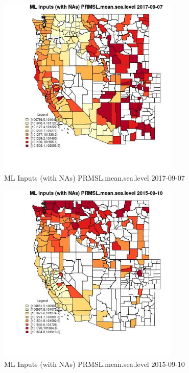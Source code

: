 \clearpage 

\begin{figure} 
\centering  
\includegraphics[width=0.77\textwidth]{Code_Outputs/Report_ML_input_PM25_Step4_part_e_de_duplicated_aves_compiled_2019-05-21wNAs_CountyPRMSLmeansealevelMean2017-09-07.jpg} 
\caption{\label{fig:Report_ML_input_PM25_Step4_part_e_de_duplicated_aves_compiled_2019-05-21wNAsCountyPRMSLmeansealevelMean2017-09-07}ML Inputs (with NAs) PRMSL.mean.sea.level 2017-09-07} 
\end{figure} 
 

\begin{figure} 
\centering  
\includegraphics[width=0.77\textwidth]{Code_Outputs/Report_ML_input_PM25_Step4_part_e_de_duplicated_aves_compiled_2019-05-21wNAs_CountyPRMSLmeansealevelMean2015-09-10.jpg} 
\caption{\label{fig:Report_ML_input_PM25_Step4_part_e_de_duplicated_aves_compiled_2019-05-21wNAsCountyPRMSLmeansealevelMean2015-09-10}ML Inputs (with NAs) PRMSL.mean.sea.level 2015-09-10} 
\end{figure} 
 

